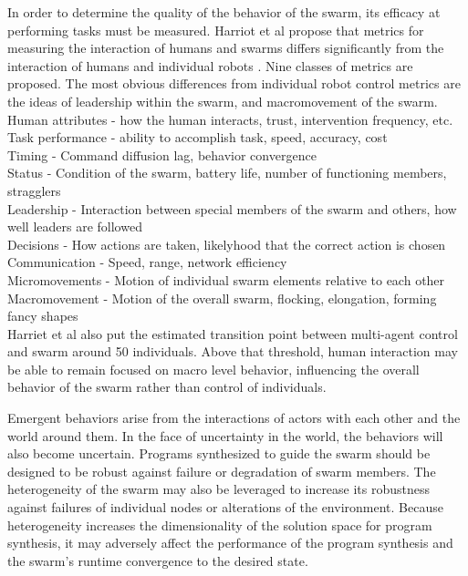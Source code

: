 \documentclass[]{article}
\begin{document}
In order to determine the quality of the behavior of the swarm, its efficacy at performing tasks must be measured. 
Harriot et al propose that metrics for measuring the interaction of humans and swarms differs significantly from the interaction of humans and individual robots \cite{harriott2014biologically}.
Nine classes of metrics are proposed. 
The most obvious differences from individual robot control metrics are the ideas of leadership within the swarm, and macromovement of the swarm. 
Human attributes - how the human interacts, trust, intervention frequency, etc. \\
Task performance - ability to accomplish task, speed, accuracy, cost \\
Timing - Command diffusion lag, behavior convergence \\
Status - Condition of the swarm, battery life, number of functioning members, stragglers \\
Leadership - Interaction between special members of the swarm and others, how well leaders are followed \\
Decisions - How actions are taken, likelyhood that the correct action is chosen \\
Communication - Speed, range, network efficiency \\
Micromovements - Motion of individual swarm elements relative to each other \\
Macromovement - Motion of the overall swarm, flocking, elongation, forming fancy shapes \\ 
Harriet et al also put the estimated transition point between multi-agent control and swarm around 50 individuals. 
Above that threshold, human interaction may be able to remain focused on macro level behavior, influencing the overall behavior of the swarm rather than control of individuals. 

Emergent behaviors arise from the interactions of actors with each other and the world around them. 
In the face of uncertainty in the world, the behaviors will also become uncertain. 
Programs synthesized to guide the swarm should be designed to be robust against failure or degradation of swarm members. 
The heterogeneity of the swarm may also be leveraged to increase its robustness against failures of individual nodes or alterations of the environment. 
Because heterogeneity increases the dimensionality of the solution space for program synthesis, it may adversely affect the performance of the program synthesis and the swarm's runtime convergence to the desired state.
\end{document}
